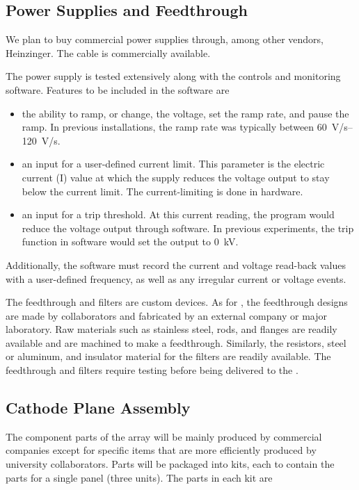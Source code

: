 \subsection{Power Supplies and Feedthrough}
\label{sec:fdsp-hv-supplies-feedthrough}

We plan to buy commercial power supplies through, among other vendors, Heinzinger. 
The  cable is commercially available.

The power supply is tested extensively along with the controls and monitoring software.  Features to be included in the software are
\begin{itemize}
\item the ability to ramp, or change, the voltage, set the ramp rate, and pause the ramp. %
In previous installations, the ramp rate was typically between \SIrange{60}{120}{V/s}.
\item an input for a user-defined current limit.  This parameter is the electric current (I) value at which the supply reduces the voltage output to stay below the current limit.  The current-limiting is done in hardware.
\item an input for a trip threshold.  At this current reading, the program would reduce the voltage output through software.  In previous experiments, the trip function in software would set the output to \SI{0}{kV}.
\end{itemize}
Additionally, the software must
record the current and voltage read-back values with a user-defined frequency, as well as any irregular current or voltage events.



The  feedthrough and filters are custom devices. As for , the feedthrough  designs are made by collaborators and fabricated by an external company or major laboratory.
 Raw materials such as stainless steel,  rods, and flanges are readily available and are machined to make a feedthrough. Similarly, the resistors, steel or aluminum, and insulator material for the filters are readily available. The feedthrough and filters require testing before being delivered to the . %
 
\subsection{Cathode Plane Assembly}
\label{sec:fdsp-hv-prod-cpa}
 The component parts of the  array will be mainly produced by commercial companies except for specific items that are more efficiently produced by university collaborators.  Parts will be packaged into kits, each to contain the parts for a single  panel
(three  units). The parts in each kit are

